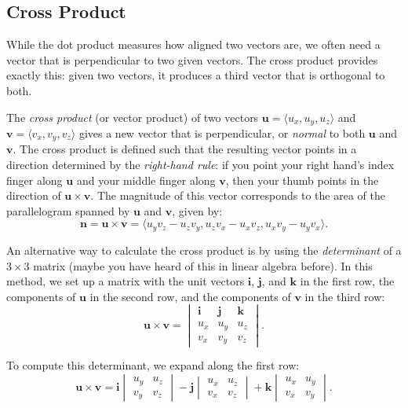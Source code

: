 \subsection*{Cross Product} 

\noindent While the dot product measures how aligned two vectors are, we often need a vector that is perpendicular to two given vectors. The cross product provides exactly this: given two vectors, it produces a third vector that is orthogonal to both.

The \textit{cross product} (or vector product) of two vectors \( \mathbf{u} = \langle u_x, u_y, u_z \rangle \) and \( \mathbf{v} = \langle v_x, v_y, v_z \rangle \) gives a new vector that is perpendicular, or \textit{normal} to both \( \mathbf{u} \) and \( \mathbf{v} \). The cross product is defined such that the resulting vector points in a direction determined by the \textit{right-hand rule}: if you point your right hand’s index finger along \( \mathbf{u} \) and your middle finger along \( \mathbf{v} \), then your thumb points in the direction of \( \mathbf{u} \times \mathbf{v} \). The magnitude of this vector corresponds to the area of the parallelogram spanned by \( \mathbf{u} \) and \( \mathbf{v} \), given by:
\[
\mathbf{n} = \mathbf{u} \times \mathbf{v} = \langle u_y v_z - u_z v_y, u_z v_x - u_x v_z, u_x v_y - u_y v_x \rangle.
\]

\noindent An alternative way to calculate the cross product is by using the \textit{determinant} of a \( 3 \times 3 \) matrix (maybe you have heard of this in linear algebra before). In this method, we set up a matrix with the unit vectors \( \mathbf{i} \), \( \mathbf{j} \), and \( \mathbf{k} \) in the first row, the components of \( \mathbf{u} \) in the second row, and the components of \( \mathbf{v} \) in the third row:
\[
\mathbf{u} \times \mathbf{v} = \begin{vmatrix} \mathbf{i} & \mathbf{j} & \mathbf{k} \\ u_x & u_y & u_z \\ v_x & v_y & v_z \end{vmatrix}.
\]

To compute this determinant, we expand along the first row:
\[
\mathbf{u} \times \mathbf{v} = \mathbf{i} \begin{vmatrix} u_y & u_z \\ v_y & v_z \end{vmatrix} - \mathbf{j} \begin{vmatrix} u_x & u_z \\ v_x & v_z \end{vmatrix} + \mathbf{k} \begin{vmatrix} u_x & u_y \\ v_x & v_y \end{vmatrix}.
\]

